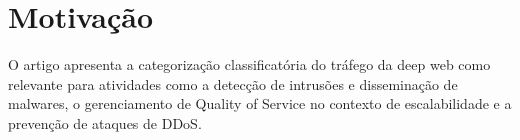 \section{Motivação}

O artigo apresenta a categorização 
classificatória do tráfego da deep web 
como relevante para atividades como a 
detecção de intrusões e disseminação de
malwares, o gerenciamento de Quality of
Service no contexto de escalabilidade e a 
prevenção de ataques de DDoS.